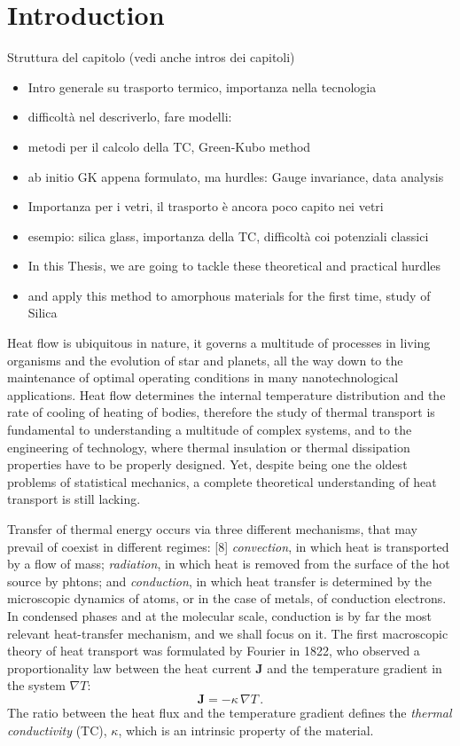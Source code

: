 \chapter{Introduction}

Struttura del capitolo  (vedi anche intros dei capitoli)
\begin{itemize}
    \item Intro generale su trasporto termico, importanza nella tecnologia
    \item difficoltà nel descriverlo, fare modelli: 
    \item metodi per il calcolo della TC, Green-Kubo method
    \item ab initio GK appena formulato, ma hurdles: Gauge invariance, data analysis
    \item Importanza per i vetri, il trasporto è ancora poco capito nei vetri
    \item esempio: silica glass, importanza della TC, difficoltà coi potenziali classici
    \item In this Thesis, we are going to tackle these theoretical and practical hurdles
    \item and apply this method to amorphous materials for the first time, study of Silica
\end{itemize}

Heat flow is ubiquitous in nature, it governs a multitude of  processes in living organisms and the evolution of star and planets, all the way down to the maintenance of optimal operating conditions in many nanotechnological applications. 
Heat flow determines the internal temperature distribution and the rate of cooling of heating of bodies, therefore the study of thermal transport is fundamental to understanding a multitude of complex systems, and to the engineering of technology, where thermal insulation or thermal dissipation properties have to be properly designed. 
Yet, despite being one the oldest problems of statistical mechanics, a complete theoretical understanding of heat transport is still lacking. 

Transfer of thermal energy occurs via three different mechanisms, that may prevail of coexist in different regimes: [8] \emph{convection}, in which heat is transported by a flow of mass; \emph{radiation}, in which heat is removed from the surface of the hot source by phtons; and \emph{conduction}, in which heat transfer is determined by the microscopic dynamics of atoms, or in the case of metals, of conduction electrons. 
In condensed phases and at the molecular scale, conduction is by far the most relevant heat-transfer mechanism, and we shall focus on it. 
The first macroscopic theory of heat transport was formulated by Fourier in 1822, who observed a proportionality law between the heat current $\mathbf{J}$ and the temperature gradient in the system $\nabla T$:
\begin{equation}
    \mathbf{J} = -\kappa\, \nabla T \,.  \label{eq:Fourier-law}
\end{equation}
The ratio between the heat flux and the temperature gradient defines the \emph{thermal conductivity} (TC), $\kappa$, which is an intrinsic property of the material. 

